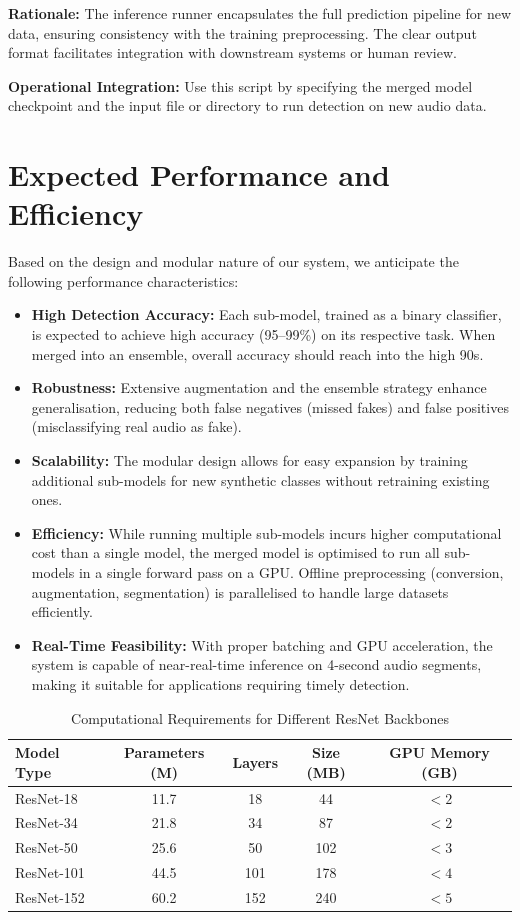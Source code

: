 \documentclass[conference]{IEEEtran}  %
\begin{document}
\textbf{Rationale:} The inference runner encapsulates the full prediction pipeline for new data, ensuring consistency with the training preprocessing. The clear output format facilitates integration with downstream systems or human review.

\textbf{Operational Integration:} Use this script by specifying the merged model checkpoint and the input file or directory to run detection on new audio data.

\section{Expected Performance and Efficiency}
Based on the design and modular nature of our system, we anticipate the following performance characteristics:
\begin{itemize}
    \item \textbf{High Detection Accuracy:} Each sub-model, trained as a binary classifier, is expected to achieve high accuracy (95--99\%) on its respective task. When merged into an ensemble, overall accuracy should reach into the high 90s.
    \item \textbf{Robustness:} Extensive augmentation and the ensemble strategy enhance generalisation, reducing both false negatives (missed fakes) and false positives (misclassifying real audio as fake).
    \item \textbf{Scalability:} The modular design allows for easy expansion by training additional sub-models for new synthetic classes without retraining existing ones.
    \item \textbf{Efficiency:} While running multiple sub-models incurs higher computational cost than a single model, the merged model is optimised to run all sub-models in a single forward pass on a GPU. Offline preprocessing (conversion, augmentation, segmentation) is parallelised to handle large datasets efficiently.
    \item \textbf{Real-Time Feasibility:} With proper batching and GPU acceleration, the system is capable of near-real-time inference on 4-second audio segments, making it suitable for applications requiring timely detection.
\end{itemize}

\begin{table}[t]
\caption{Computational Requirements for Different ResNet Backbones}
\label{tab:model_comparison}
\centering
\begin{tabular}{|l|c|c|c|c|}
\hline
\textbf{Model Type} & \textbf{Parameters (M)} & \textbf{Layers} & \textbf{Size (MB)} & \textbf{GPU Memory (GB)} \\
\hline
ResNet-18 & 11.7 & 18 & 44 & $< 2$ \\
\hline
ResNet-34 & 21.8 & 34 & 87 & $< 2$ \\
\hline
ResNet-50 & 25.6 & 50 & 102 & $< 3$ \\
\hline
ResNet-101 & 44.5 & 101 & 178 & $< 4$ \\
\hline
ResNet-152 & 60.2 & 152 & 240 & $< 5$ \\
\hline
\end{tabular}
\end{table}
\end{document}
